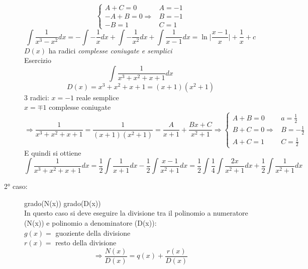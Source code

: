 \begin{description}
\begin{tasks}
\begin{equation*}
				\begin{cases}
					A+C=0&A=-1\\
					-A+B=0\Rightarrow&B=-1\\
					-B=1&C=1
				\end{cases}
			\end{equation*}
			\begin{equation*}
				\int \frac{1}{x^3-x^2}dx=-\int -\frac{1}{x}dx+\int-\frac{1}{x^2}dx+\int \frac{1}{x-1}dx=\ln\bigg|\frac{x-1}{x}\bigg|+\frac{1}{x}+c
			\end{equation*}
			\task $D(x)$ ha radici \textit{complesse coniugate e semplici}\\
				Esercizio
				\begin{equation*}
					\int \frac{1}{x^3+x^2+x+1}dx
				\end{equation*}
				\begin{equation*}
					D(x)=x^3+x^2+x+1=(x+1)(x^2+1)
				\end{equation*}
				3 radici: $x=-1$ reale semplice\\
				$x=\mp 1$ complesse coniugate
				\begin{equation*}
					\Rightarrow\frac{1}{x^3+x^2+x+1}=\frac{1}{(x+1)(x^2+1)}=\frac{A}{x+1}+\frac{Bx+C}{x^2+1}\Rightarrow
					 \begin{cases}
						A+B=0&a=\frac{1}{2}\\
						B+C=0\Rightarrow&B=-\frac{1}{2}\\
						A+C=1&C=\frac{1}{2}
					\end{cases}
				\end{equation*}
				E quindi si ottiene
				\begin{equation*}
					\int
					\frac{1}{x^3+x^2+x+1}dx=\frac{1}{2}
					\int\frac{1}{x+1}dx-\frac{1}{2}\int\frac{x-1}{x^2+1}dx=
					\frac{1}{2}\int\frac{1}{4}\int\frac{2x}{x^2+1}dx+
					\frac{1}{2}\int\frac{1}{x^2+1}dx
				\end{equation*}
		\end{tasks} 
		\item [2° caso: ] grado(N(x)) grado(D(x))\\
		In questo caso si deve eseguire la divisione tra il polinomio a
		numeratore (N(x)) e polinomio a denominatore (D(x)):\\
		$g(x)=$ guoziente della divisione\\
		$r(x)=$ resto della divisione\\
		\begin{equation*}
			\Rightarrow \frac{N(x)}{D(x)}=q(x)+\frac{r(x)}{D(x)}
		\end{equation*}

\end{description}
